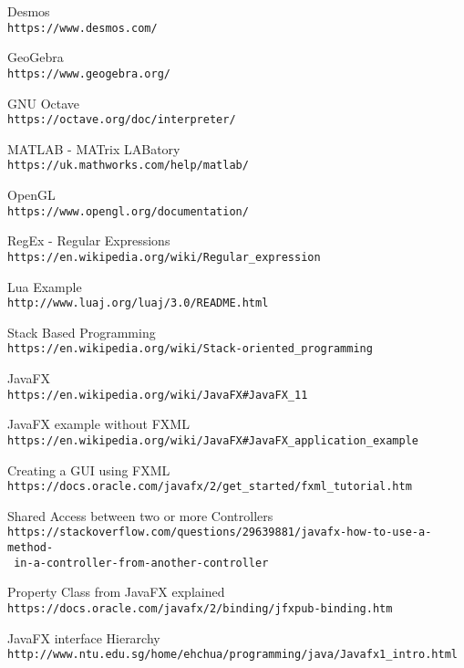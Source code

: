 \documentclass[../../main.tex]{subfiles}
\begin{document}
\begin{thebibliography}{9}

Desmos\\
\texttt{https://www.desmos.com/}

GeoGebra\\
\texttt{https://www.geogebra.org/}

GNU Octave\\
\texttt{https://octave.org/doc/interpreter/}

MATLAB - MATrix LABatory\\
\texttt{https://uk.mathworks.com/help/matlab/}

OpenGL\\
\texttt{https://www.opengl.org/documentation/}

RegEx - Regular Expressions\\
\texttt{https://en.wikipedia.org/wiki/Regular\_expression}

Lua Example\\
\texttt{http://www.luaj.org/luaj/3.0/README.html}

Stack Based Programming\\
\texttt{https://en.wikipedia.org/wiki/Stack-oriented\_programming}

JavaFX\\
\texttt{https://en.wikipedia.org/wiki/JavaFX\#JavaFX\_11}

JavaFX example without FXML\\
\texttt{https://en.wikipedia.org/wiki/JavaFX\#JavaFX\_application\_example}

Creating a GUI using FXML\\
\texttt{https://docs.oracle.com/javafx/2/get\_started/fxml\_tutorial.htm}

Shared Access between two or more Controllers\\
\texttt{https://stackoverflow.com/questions/29639881/javafx-how-to-use-a-method-\\\ in-a-controller-from-another-controller}

Property Class from JavaFX explained\\
\texttt{https://docs.oracle.com/javafx/2/binding/jfxpub-binding.htm}

JavaFX interface Hierarchy\\
\texttt{http://www.ntu.edu.sg/home/ehchua/programming/java/Javafx1\_intro.html}


\end{thebibliography}
\end{document}

